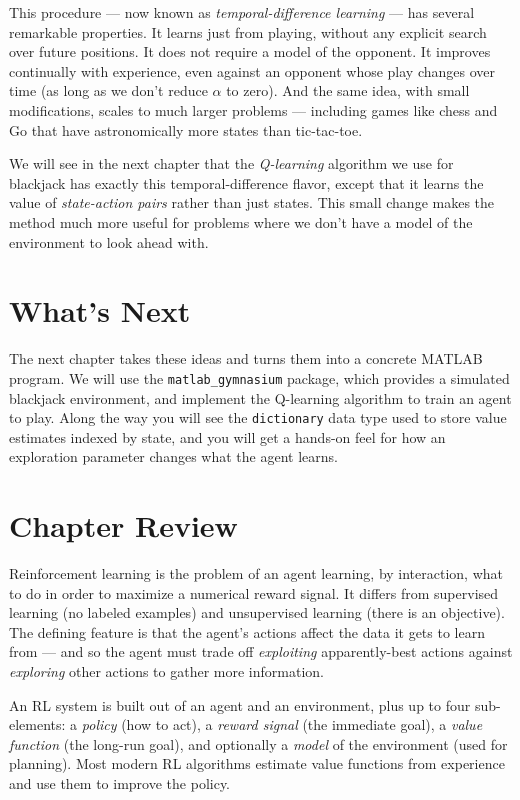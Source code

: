 \documentclass[../../book.tex]{subfiles}
\begin{document}
This procedure --- now known as \emph{temporal-difference learning} --- has several remarkable properties.  It learns just from playing, without any explicit search over future positions.  It does not require a model of the opponent.  It improves continually with experience, even against an opponent whose play changes over time (as long as we don't reduce $\alpha$ to zero).  And the same idea, with small modifications, scales to much larger problems --- including games like chess and Go that have astronomically more states than tic-tac-toe.

We will see in the next chapter that the \emph{Q-learning} algorithm we use for blackjack has exactly this temporal-difference flavor, except that it learns the value of \emph{state-action pairs} rather than just states.  This small change makes the method much more useful for problems where we don't have a model of the environment to look ahead with.

\section{What's Next}

The next chapter takes these ideas and turns them into a concrete MATLAB program.  We will use the \texttt{matlab\_gymnasium} package, which provides a simulated blackjack environment, and implement the Q-learning algorithm to train an agent to play.  Along the way you will see the \texttt{dictionary} data type used to store value estimates indexed by state, and you will get a hands-on feel for how an exploration parameter changes what the agent learns.

\section{Chapter Review}

Reinforcement learning is the problem of an agent learning, by interaction, what to do in order to maximize a numerical reward signal.  It differs from supervised learning (no labeled examples) and unsupervised learning (there is an objective).  The defining feature is that the agent's actions affect the data it gets to learn from --- and so the agent must trade off \emph{exploiting} apparently-best actions against \emph{exploring} other actions to gather more information.

An RL system is built out of an agent and an environment, plus up to four sub-elements: a \emph{policy} (how to act), a \emph{reward signal} (the immediate goal), a \emph{value function} (the long-run goal), and optionally a \emph{model} of the environment (used for planning).  Most modern RL algorithms estimate value functions from experience and use them to improve the policy.
\end{document}
